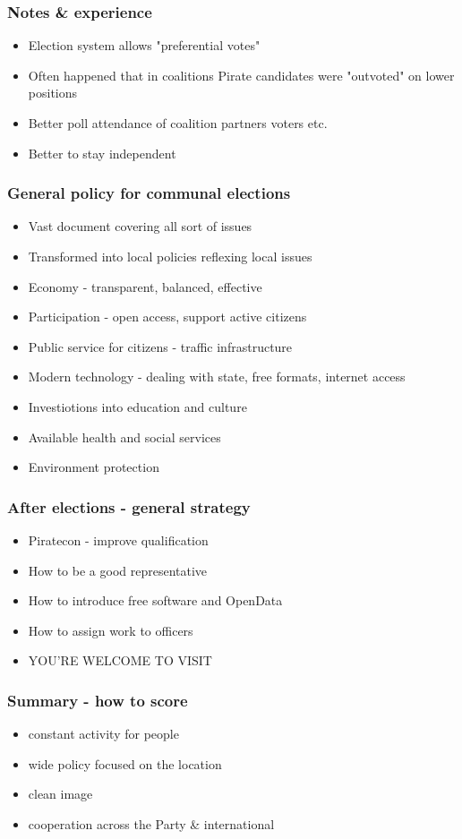 \begin{frame}
	\frametitle{Notes \& experience}
	\begin{itemize}
		\item Election system allows "preferential votes"
		\item Often happened that in coalitions Pirate candidates were "outvoted" on lower positions
		\item Better poll attendance of coalition partners voters etc.
		\item Better to stay independent
	\end{itemize}
\end{frame}
\begin{frame}
	\frametitle{General policy for communal elections}
	\begin{itemize}
		\item Vast document covering all sort of issues
		\item Transformed into local policies reflexing local issues
		\item Economy - transparent, balanced, effective
		\item Participation - open access, support active citizens
		\item Public service for citizens - traffic infrastructure
		\item Modern technology - dealing with state, free formats, internet access
		\item Investiotions into education and culture
		\item Available health and social services
		\item Environment protection
	\end{itemize}
\end{frame}
\begin{frame}
	\frametitle{After elections - general strategy}
	\begin{itemize}
		\item Piratecon - improve qualification
		\item How to be a good representative
		\item How to introduce free software and OpenData
		\item How to assign work to officers
		\item YOU'RE WELCOME TO VISIT
	\end{itemize}
\end{frame}
\begin{frame}
	\frametitle{Summary - how to score}
	\begin{itemize}
		\item constant activity for people
		\item wide policy focused on the location
		\item clean image
		\item cooperation across the Party \& international
	\end{itemize}
\end{frame}

